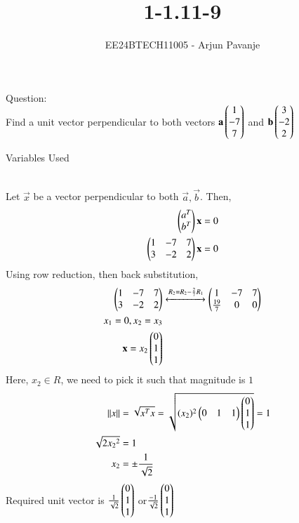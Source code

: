 \documentclass[journal]{IEEEtran}
\begin{document}

\vspace{3cm}

\title{1-1.11-9}
\author{EE24BTECH11005 - Arjun Pavanje}
{\let\newpage\relax\maketitle}
Question:\\
Find a unit vector perpendicular to both vectors $\mathbf{a}\begin{pmatrix}1\\-7\\7\end{pmatrix}$ and $\mathbf{b}\begin{pmatrix}3\\-2\\2\end{pmatrix}$
\begin{table}[h!]    
  \centering
  
  \caption{Variables Used}
  \label{tab1-1.9-6}
\end{table}\\
\solution
Let $\vec{x}$ be a vector perpendicular to both $\vec{a},\vec{b}$. Then,
\begin{align}
	\begin{pmatrix}a^T\\b^T\end{pmatrix}\mathbf{x}=0\\
	\begin{pmatrix}1&-7&7\\3&-2&2\end{pmatrix}\mathbf{x}=0
\end{align}
Using row reduction, then back substitution,
\begin{align}
	\begin{pmatrix}1&-7&7\\3&-2&2\end{pmatrix}&\xleftrightarrow[]{R_2=R_2-\frac{2}{7}R_1}\begin{pmatrix}1&-7&7\\\frac{19}{7}&0&0\end{pmatrix}\\
	x_1=0, x_2=x_3\\
	\mathbf{x}=x_2\begin{pmatrix}0\\1\\1\end{pmatrix}
\end{align}
Here, $x_2 \in R$, we need to pick it such that magnitude is $1$
\begin{align}
	\left\lVert x\right\rVert&=\sqrt{x^Tx}=\sqrt{(x_2)^2\begin{pmatrix}0&1&1\end{pmatrix}\begin{pmatrix}0\\1\\1\end{pmatrix}}=1\\
	\sqrt{2{x_2}^2}&=1\\
	x_2&=\pm \frac{1}{\sqrt{2}}
\end{align}
Required unit vector is $\frac{1}{\sqrt{2}}\begin{pmatrix}0\\1\\1\end{pmatrix}$ or$\frac{-1}{\sqrt{2}}\begin{pmatrix}0\\1\\1\end{pmatrix}$ 
\end{document}
